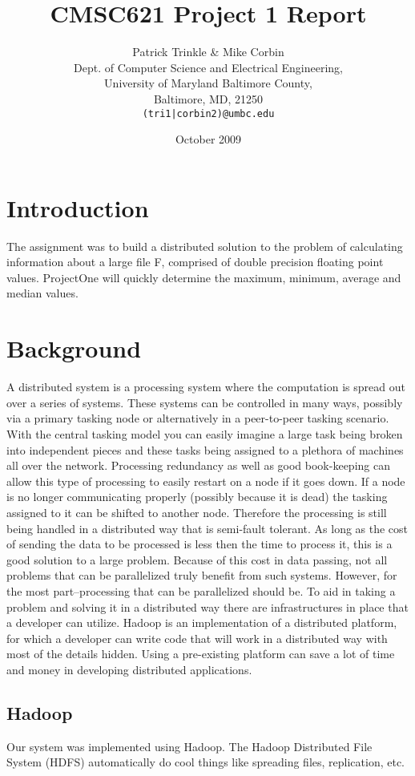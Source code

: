 \documentclass[11pt]{article}
\title{CMSC621 Project 1 Report}
\author{Patrick Trinkle \& Mike Corbin\\
Dept. of Computer Science and Electrical Engineering,\\
University of Maryland Baltimore County,\\
Baltimore, MD, 21250\\
\texttt{(tri1|corbin2)@umbc.edu}}
\date{October 2009}
\begin{document}
\maketitle

\section{Introduction}
The assignment was to build a distributed solution to the problem of calculating information about a large file F, comprised of double precision floating point values.  ProjectOne will quickly determine the maximum, minimum, average and median values.

\section{Background}
A distributed system is a processing system where the computation is spread out over a series of systems.  These systems can be controlled in many ways, possibly via a primary tasking node or alternatively in a peer-to-peer tasking scenario.  With the central tasking model you can easily imagine a large task being broken into independent pieces and these tasks being assigned to a plethora of machines all over the network.  Processing redundancy as well as good book-keeping can allow this type of processing to easily restart on a node if it goes down.  If a node is no longer communicating properly (possibly because it is dead) the tasking assigned to it can be shifted to another node.  Therefore the processing is still being handled in a distributed way that is semi-fault tolerant.  As long as the cost of sending the data to be processed is less then the time to process it, this is a good solution to a large problem.  Because of this cost in data passing, not all problems that can be parallelized truly benefit from such systems.  However, for the most part--processing that can be parallelized should be.  To aid in taking a problem and solving it in a distributed way there are infrastructures in place that a developer can utilize.  Hadoop is an implementation of a distributed platform, for which a developer can write code that will work in a distributed way with most of the details hidden.  Using a pre-existing platform can save a lot of time and money in developing distributed applications.

\subsection{Hadoop}
Our system was implemented using Hadoop.  The Hadoop Distributed File System (HDFS) automatically do cool things like spreading files, replication, etc.
\end{document}
